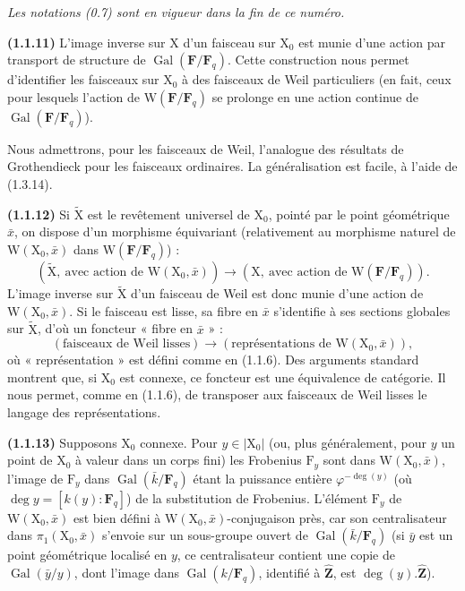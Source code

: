 \documentclass[11pt,leqno]{article}
\begin{document}
\textit{Les notations \textup{(0.7)} sont en vigueur dans la fin de ce numéro.}

\textbf{(1.1.11)} L’image inverse sur \(\mathrm{X}\) d’un faisceau sur \(\mathrm{X}_0\) est munie d’une action par transport de structure de \(\operatorname{Gal}(\mathbf{F}/\mathbf{F}_q)\). Cette construction nous permet d’identifier les faisceaux sur \(\mathrm{X}_0\) à des faisceaux de Weil particuliers (en fait, ceux pour lesquels l’action de \(\mathrm{W}(\mathbf{F}/\mathbf{F}_q)\) se prolonge en une action continue de \(\operatorname{Gal}(\mathbf{F}/\mathbf{F}_q)\)).

Nous admettrons, pour les faisceaux de Weil, l’analogue des résultats de Grothendieck pour les faisceaux ordinaires. La généralisation est facile, à l’aide de (1.3.14).

\textbf{(1.1.12)} Si \(\widetilde{\mathrm{X}}\) est le revêtement universel de \(\mathrm{X}_0\), pointé par le point géométrique \(\bar x\), on dispose d’un morphisme équivariant (relativement au morphisme naturel de \(\mathrm{W}(\mathrm{X}_0,\bar x)\) dans \(\mathrm{W}(\mathbf{F}/\mathbf{F}_q)\)) :
\[
(\widetilde{\mathrm{X}},\ \text{avec action de }\mathrm{W}(\mathrm{X}_0,\bar x))
\to
(\mathrm{X},\ \text{avec action de }\mathrm{W}(\mathbf{F}/\mathbf{F}_q)).
\]
L’image inverse sur \(\widetilde{\mathrm{X}}\) d’un faisceau de Weil est donc munie d’une action de \(\mathrm{W}(\mathrm{X}_0,\bar x)\). Si le faisceau est lisse, sa fibre en \(\bar x\) s’identifie à ses sections globales sur \(\widetilde{\mathrm{X}}\), d’où un foncteur « fibre en \(\bar x\) » :
\[
(\text{faisceaux de Weil lisses})
\to
(\text{représentations de }\mathrm{W}(\mathrm{X}_0,\bar x)),
\]
où « représentation » est défini comme en (1.1.6). Des arguments standard montrent que, si \(\mathrm{X}_0\) est connexe, ce foncteur est une équivalence de catégorie. Il nous permet, comme en (1.1.6), de transposer aux faisceaux de Weil lisses le langage des représentations.

\textbf{(1.1.13)} Supposons \(\mathrm{X}_0\) connexe. Pour \(y\in|\mathrm{X}_0|\) (ou, plus généralement, pour \(y\) un point de \(\mathrm{X}_0\) à valeur dans un corps fini) les Frobenius \(\mathrm{F}_y\) sont dans \(\mathrm{W}(\mathrm{X}_0,\bar x)\), l’image de \(\mathrm{F}_y\) dans \(\operatorname{Gal}(\bar k/\mathbf{F}_q)\) étant la puissance entière \(\varphi^{-\deg(y)}\) (où \(\deg y=[k(y):\mathbf{F}_q]\)) de la substitution de Frobenius. L’élément \(\mathrm{F}_y\) de \(\mathrm{W}(\mathrm{X}_0,\bar x)\) est bien défini à \(\mathrm{W}(\mathrm{X}_0,\bar x)\)-conjugaison près, car son centralisateur dans \(\pi_1(\mathrm{X}_0,\bar x)\) s’envoie sur un sous-groupe ouvert de \(\operatorname{Gal}(\bar k/\mathbf{F}_q)\) (si \(\bar y\) est un point géométrique localisé en \(y\), ce centralisateur contient une copie de \(\operatorname{Gal}(\bar y/y)\), dont l’image dans \(\operatorname{Gal}(k/\mathbf{F}_q)\), identifié à \(\widehat{\mathbf{Z}}\), est \(\deg(y).\widehat{\mathbf{Z}}\)).
\end{document}
